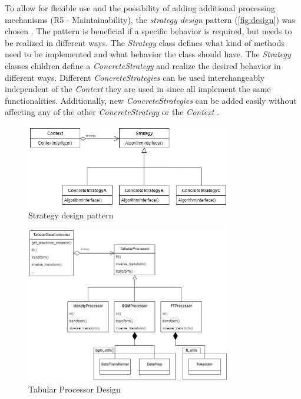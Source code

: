 To allow for flexible use and the possibility of adding additional processing mechanisms (R5 - Maintainability), the \textit{strategy design} pattern (\autoref{fig:design}) was chosen \cite{gamma1994design}.
The pattern is beneficial if a specific behavior is required, but needs to be realized in different ways.
The \textit{Strategy} class defines what kind of methods need to be implemented and what behavior the class should have.
The \textit{Strategy} classes children define a \textit{ConcreteStrategy} and realize the desired behavior in different ways.
Different \textit{ConcreteStrategies} can be used interchangeably independent of the \textit{Context} they are used in since all implement the same functionalities.
Additionally, new \textit{ConcreteStrategies} can be added easily without affecting any of the other \textit{ConcreteStrategy} or the \textit{Context} \cite{gamma1994design}.

\begin{figure}[h]
	\centering
	\includegraphics[width=0.8\textwidth]{images/strategy.png}
	\caption[Strategy Design Pattern]{Strategy design pattern \cite[p. 316]{gamma1994design}}
	\label{fig:design}
\end{figure}

\begin{figure}[h]
	\centering
	\includegraphics[width=0.8\textwidth]{images/tabular_processor.png}
	\caption[Tabular Processor Design]{Tabular Processor Design}
	\label{fig:tabular_processor}
\end{figure}

